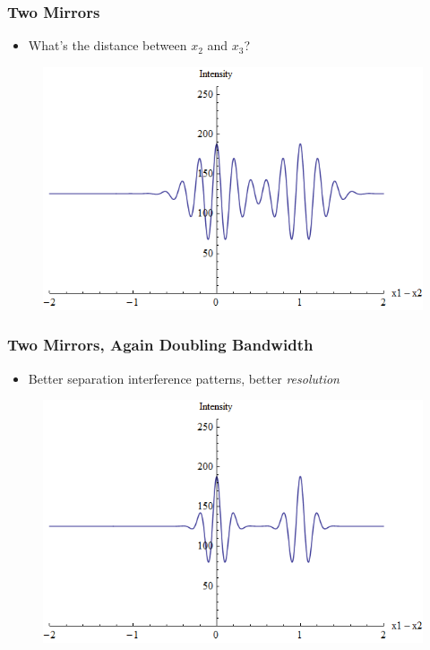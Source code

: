 \begin{frame}
    \frametitle{Two Mirrors}
    \begin{itemize}
        \item What's the distance between $x_2$ and $x_3$?
    \end{itemize}
    \begin{figure}
        \includegraphics[height=0.65\textheight]{figures/DoubleInterference1.png}
    \end{figure}

\end{frame}


\begin{frame}
    \frametitle{Two Mirrors, Again Doubling Bandwidth}
    \begin{itemize}
        \item Better separation interference patterns, better \emph{resolution}
    \end{itemize}
    \begin{figure}
        \includegraphics[height=0.65\textheight]{figures/DoubleInterference2.png}
    \end{figure}

\end{frame}



